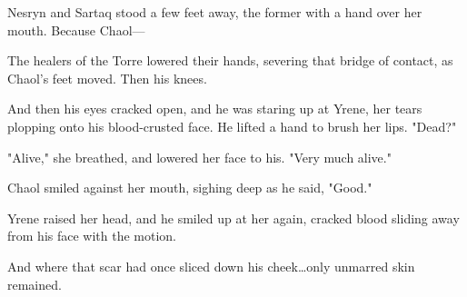 Nesryn and Sartaq stood a few feet away, the former with a hand over her mouth.
Because Chaol---

The healers of the Torre lowered their hands, severing that bridge of contact, as Chaol's feet moved.
Then his knees.

And then his eyes cracked open, and he was staring up at Yrene, her tears plopping onto his blood-crusted face.
He lifted a hand to brush her lips.
"Dead?"

"Alive," she breathed, and lowered her face to his.
"Very much alive."

Chaol smiled against her mouth, sighing deep as he said, "Good."

Yrene raised her head, and he smiled up at her again, cracked blood sliding away from his face with the motion.

And where that scar had once sliced down his cheek\ldots only unmarred skin remained.

